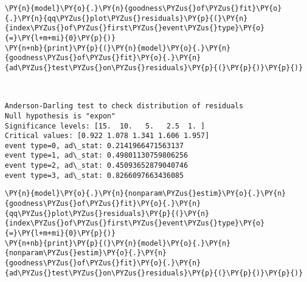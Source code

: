 \documentclass[10pt, article,table]{article}
\begin{document}
\begin{tcolorbox}[breakable, size=fbox, boxrule=1pt, pad at break*=1mm,colback=cellbackground, colframe=cellborder]
\begin{Verbatim}[commandchars=\\\{\}, fontsize=\small]
\PY{n}{model}\PY{o}{.}\PY{n}{goodness\PYZus{}of\PYZus{}fit}\PY{o}{.}\PY{n}{qq\PYZus{}plot\PYZus{}residuals}\PY{p}{(}\PY{n}{index\PYZus{}of\PYZus{}first\PYZus{}event\PYZus{}type}\PY{o}{=}\PY{l+m+mi}{0}\PY{p}{)}
\PY{n+nb}{print}\PY{p}{(}\PY{n}{model}\PY{o}{.}\PY{n}{goodness\PYZus{}of\PYZus{}fit}\PY{o}{.}\PY{n}{ad\PYZus{}test\PYZus{}on\PYZus{}residuals}\PY{p}{(}\PY{p}{)}\PY{p}{)}
\end{Verbatim}
\end{tcolorbox}
\begin{tcolorbox}[breakable, size=fbox, boxrule=.5pt, pad at break*=1mm, opacityfill=0]
\begin{center}
    \end{center}
    { \hspace*{\fill} \\}
    
    \begin{Verbatim}[commandchars=\\\{\}, fontsize=\small]
Anderson-Darling test to check distribution of residuals
Null hypothesis is "expon"
Significance levels: [15.  10.   5.   2.5  1. ]
Critical values: [0.922 1.078 1.341 1.606 1.957]
event type=0, ad\_stat: 0.2141966471563137
event type=1, ad\_stat: 0.49801130759806256
event type=2, ad\_stat: 0.45093652879040746
event type=3, ad\_stat: 0.8266097663436085
    \end{Verbatim}
\end{tcolorbox}
\begin{tcolorbox}[breakable, size=fbox, boxrule=1pt, pad at break*=1mm,colback=cellbackground, colframe=cellborder]
\begin{Verbatim}[commandchars=\\\{\}, fontsize=\small]
\PY{n}{model}\PY{o}{.}\PY{n}{nonparam\PYZus{}estim}\PY{o}{.}\PY{n}{goodness\PYZus{}of\PYZus{}fit}\PY{o}{.}\PY{n}{qq\PYZus{}plot\PYZus{}residuals}\PY{p}{(}\PY{n}{index\PYZus{}of\PYZus{}first\PYZus{}event\PYZus{}type}\PY{o}{=}\PY{l+m+mi}{0}\PY{p}{)}
\PY{n+nb}{print}\PY{p}{(}\PY{n}{model}\PY{o}{.}\PY{n}{nonparam\PYZus{}estim}\PY{o}{.}\PY{n}{goodness\PYZus{}of\PYZus{}fit}\PY{o}{.}\PY{n}{ad\PYZus{}test\PYZus{}on\PYZus{}residuals}\PY{p}{(}\PY{p}{)}\PY{p}{)}
\end{Verbatim}
\end{tcolorbox}
\end{document}

